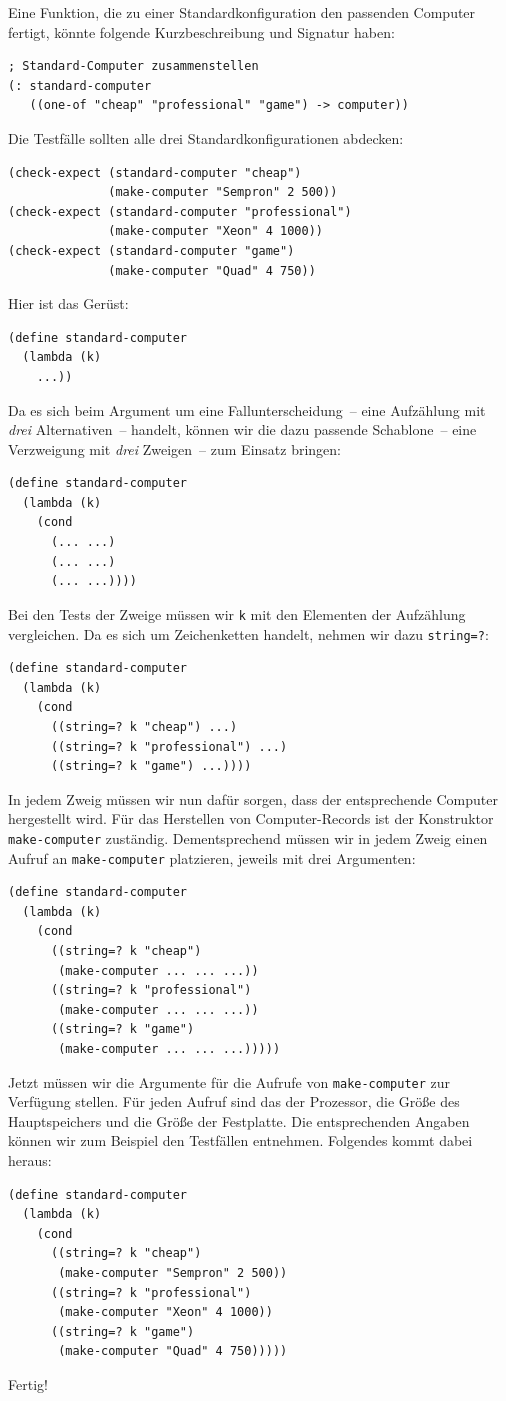 Eine Funktion, die zu einer Standardkonfiguration den passenden
Computer fertigt, könnte folgende Kurzbeschreibung und Signatur haben:
%
\begin{verbatim}
; Standard-Computer zusammenstellen
(: standard-computer
   ((one-of "cheap" "professional" "game") -> computer))
\end{verbatim}
%
Die Testfälle sollten alle drei Standardkonfigurationen abdecken:
%
\begin{verbatim}
(check-expect (standard-computer "cheap")
              (make-computer "Sempron" 2 500))
(check-expect (standard-computer "professional")
              (make-computer "Xeon" 4 1000))
(check-expect (standard-computer "game")
              (make-computer "Quad" 4 750))
\end{verbatim}
%
Hier ist das Gerüst:
%
\begin{verbatim}
(define standard-computer
  (lambda (k)
    ...))
\end{verbatim}
%
Da es sich beim Argument um eine Fallunterscheidung~-- eine Aufzählung
mit \emph{drei} Alternativen~-- handelt, können wir die
dazu passende Schablone~-- eine Verzweigung mit \emph{drei} Zweigen~--
zum Einsatz bringen:
%
\begin{verbatim}
(define standard-computer
  (lambda (k)
    (cond
      (... ...)
      (... ...)
      (... ...))))
\end{verbatim}
%
Bei den Tests der Zweige müssen wir \texttt{k} mit den Elementen der
Aufzählung vergleichen.  Da es sich um Zeichenketten handelt, nehmen
wir dazu \texttt{string=?}:
%
\begin{verbatim}
(define standard-computer
  (lambda (k)
    (cond
      ((string=? k "cheap") ...)
      ((string=? k "professional") ...)
      ((string=? k "game") ...))))
\end{verbatim}
%
In jedem Zweig müssen wir nun dafür sorgen, dass der entsprechende
Computer hergestellt wird.  Für das Herstellen von Computer-Records
ist der Konstruktor \texttt{make-computer} zuständig.  Dementsprechend
müssen wir in jedem Zweig einen Aufruf an \texttt{make-computer}
platzieren, jeweils mit drei Argumenten:
%
\begin{verbatim}
(define standard-computer
  (lambda (k)
    (cond
      ((string=? k "cheap")
       (make-computer ... ... ...))
      ((string=? k "professional")
       (make-computer ... ... ...))
      ((string=? k "game")
       (make-computer ... ... ...)))))
\end{verbatim}
%
Jetzt müssen wir die Argumente für die Aufrufe von
\texttt{make-computer} zur Verfügung stellen.  Für jeden Aufruf sind
das der Prozessor, die Größe des Hauptspeichers und die
Größe der Festplatte.  Die entsprechenden Angaben können wir zum
Beispiel den Testfällen entnehmen.  Folgendes kommt dabei heraus:
%
\begin{verbatim}
(define standard-computer
  (lambda (k)
    (cond
      ((string=? k "cheap")
       (make-computer "Sempron" 2 500))
      ((string=? k "professional")
       (make-computer "Xeon" 4 1000))
      ((string=? k "game")
       (make-computer "Quad" 4 750)))))
\end{verbatim}
%
Fertig!

